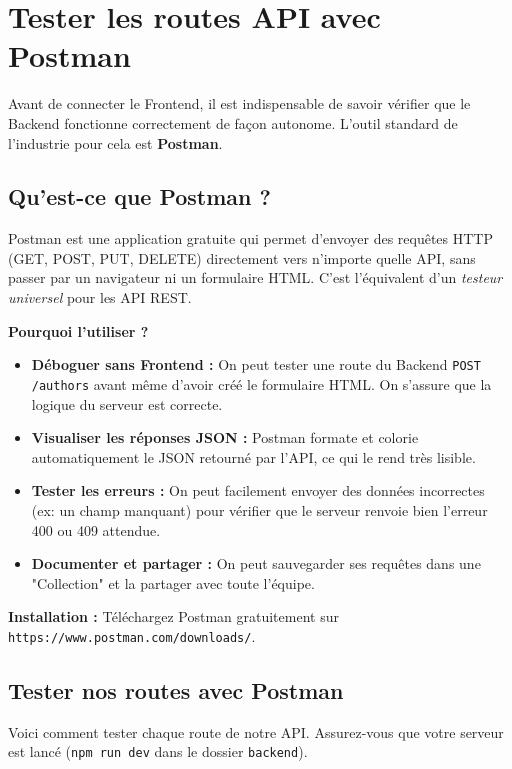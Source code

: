 \newpage

\section{Tester les routes API avec Postman}

Avant de connecter le Frontend, il est indispensable de savoir vérifier que le Backend fonctionne correctement de façon autonome. L'outil standard de l'industrie pour cela est \textbf{Postman}.

\subsection{Qu'est-ce que Postman ?}
Postman est une application gratuite qui permet d'envoyer des requêtes HTTP (GET, POST, PUT, DELETE) directement vers n'importe quelle API, sans passer par un navigateur ni un formulaire HTML. C'est l'équivalent d'un \textit{testeur universel} pour les API REST.

\textbf{Pourquoi l'utiliser ?}
\begin{itemize}
    \item \textbf{Déboguer sans Frontend :} On peut tester une route du Backend \texttt{POST /authors} avant même d'avoir créé le formulaire HTML. On s'assure que la logique du serveur est correcte.
    \item \textbf{Visualiser les réponses JSON :} Postman formate et colorie automatiquement le JSON retourné par l'API, ce qui le rend très lisible.
    \item \textbf{Tester les erreurs :} On peut facilement envoyer des données incorrectes (ex: un champ manquant) pour vérifier que le serveur renvoie bien l'erreur 400 ou 409 attendue.
    \item \textbf{Documenter et partager :} On peut sauvegarder ses requêtes dans une "Collection" et la partager avec toute l'équipe.
\end{itemize}

\textbf{Installation :} Téléchargez Postman gratuitement sur \texttt{https://www.postman.com/downloads/}.

\subsection{Tester nos routes avec Postman}

Voici comment tester chaque route de notre API. Assurez-vous que votre serveur est lancé (\texttt{npm run dev} dans le dossier \texttt{backend}).

